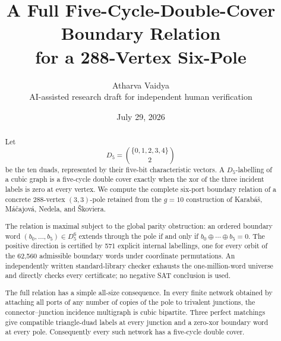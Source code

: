 \documentclass[11pt]{article}
\title{A Full Five-Cycle-Double-Cover Boundary Relation\\
for a 288-Vertex Six-Pole}
\author{Atharva Vaidya\\
\small AI-assisted research draft for independent human verification}
\date{July 29, 2026}
\theoremstyle{definition}
\theoremstyle{remark}
\newcommand{\Dfive}{D_5}
\newcommand{\xor}{\mathbin{\oplus}}
\numberwithin{equation}{section}
\begin{document}
\maketitle

\begin{center}
\end{center}

\begin{abstract}
Let
\[
        \Dfive=\binom{\{0,1,2,3,4\}}2
\]
be the ten duads, represented by their five-bit characteristic vectors.
A \(\Dfive\)-labelling of a cubic graph is a five-cycle double cover
exactly when the xor of the three incident labels is zero at every vertex.
We compute the complete six-port boundary relation of a concrete
288-vertex \((3,3)\)-pole retained from the \(g=10\) construction
of Karab\'a\v{s}, M\'a\v{c}ajov\'a, Nedela, and \v{S}koviera.

The relation is maximal subject to the global parity obstruction: an
ordered boundary word \((b_0,\ldots,b_5)\in\Dfive^6\) extends through the
pole if and only if \(b_0\xor\cdots\xor b_5=0\).  The positive direction
is certified by 571 explicit internal labellings, one for every orbit of
the 62,560 admissible boundary words under coordinate permutations.
An independently written standard-library checker exhausts the
one-million-word universe and directly checks every certificate; no
negative SAT conclusion is used.

The full relation has a simple all-size consequence.  In every finite
network obtained by attaching all ports of any number of copies of the
pole to trivalent junctions, the connector--junction incidence multigraph
is cubic bipartite.  Three perfect matchings give compatible triangle-duad
labels at every junction and a zero-xor boundary word at every pole.
Consequently every such network has a five-cycle double cover.
\end{abstract}
\end{document}
